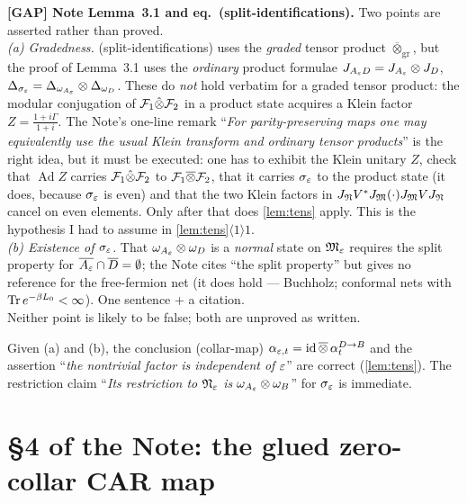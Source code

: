 \documentclass[11pt]{article}
\newcommand{\id}{\operatorname{id}}
\newcommand{\Ad}{\operatorname{Ad}}
\begin{document}
\begin{verdictgap}
\textbf{[GAP] Note Lemma~3.1 and eq.~(split-identifications).} Two points are
asserted rather than proved.\\
\emph{(a) Gradedness.} (split-identifications) uses the \emph{graded} tensor
product $\overline\otimes_{\mathrm{gr}}$, but the proof of Lemma~3.1 uses the
\emph{ordinary} product formulae $J_{A_\varepsilon D}=J_{A_\varepsilon}\otimes J_D$,
$\Delta_{\sigma_\varepsilon}=\Delta_{\omega_{A_\varepsilon}}\otimes\Delta_{\omega_D}$. These
do \emph{not} hold verbatim for a graded tensor product: the modular
conjugation of $\mathcal F_1\hat\otimes\mathcal F_2$ in a product state acquires a Klein
factor $Z=\frac{1+i\Gamma}{1+i}$. The Note's one-line remark ``\emph{For
parity-preserving maps one may equivalently use the usual Klein transform and
ordinary tensor products}'' is the right idea, but it must be executed:
one has to exhibit the Klein unitary $Z$, check that $\Ad Z$ carries
$\mathcal F_1\hat\otimes\mathcal F_2$ to $\mathcal F_1\overline\otimes\mathcal F_2$, that it carries
$\sigma_\varepsilon$ to the product state (it does, because $\sigma_\varepsilon$ is even) and
that the two Klein factors in $J_\mathfrak N V^*J_\mathfrak M(\cdot)J_\mathfrak M VJ_\mathfrak N$ cancel on
even elements. Only after that does \cref{lem:tens} apply. This is the
hypothesis I had to assume in \cref{lem:tens}$\langle1\rangle1$.\\
\emph{(b) Existence of $\sigma_\varepsilon$.} That $\omega_{A_\varepsilon}\otimes\omega_D$ is
a \emph{normal} state on $\mathfrak M_\varepsilon$ requires the split property for
$\overline{A_\varepsilon}\cap\overline D=\emptyset$; the Note cites ``the split
property'' but gives no reference for the free-fermion net (it does hold ---
Buchholz; conformal nets with $\operatorname{Tr} e^{-\beta L_0}<\infty$). One sentence + a
citation.\\
Neither point is likely to be false; both are unproved as written.
\end{verdictgap}

\begin{verdictok}
Given (a) and (b), the conclusion (collar-map)
$\alpha_{\eps,t}=\id\overline\otimes\,\alpha_t^{D\to B}$ and the assertion
``\emph{the nontrivial factor is independent of $\varepsilon$}'' are correct
(\cref{lem:tens}). The restriction claim ``\emph{Its restriction to $\mathfrak N_\varepsilon$
is $\omega_{A_\varepsilon}\otimes\omega_B$}'' for $\sigma_\varepsilon$ is immediate.
\end{verdictok}

\section{\S4 of the Note: the glued zero-collar CAR map}\label{sec:four}
\end{document}

